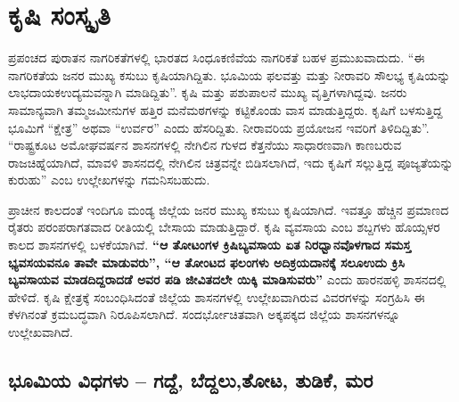 
\chapter{ಕೃಷಿ ಸಂಸ್ಕೃತಿ}

\vskip 4pt

ಪ್ರಪಂಚದ ಪುರಾತನ ನಾಗರಿಕತೆಗಳಲ್ಲಿ ಭಾರತದ ಸಿಂಧೂಕಣಿವೆಯ ನಾಗರಿಕತೆ ಬಹಳ ಪ್ರಮುಖವಾದುದು. “ಈ ನಾಗರಿಕತೆಯ ಜನರ ಮುಖ್ಯ ಕಸುಬು ಕೃಷಿಯಾಗಿದ್ದಿತು. ಭೂಮಿಯ ಫಲವತ್ತು ಮತ್ತು ನೀರಾವರಿ ಸೌಲಭ್ಯ ಕೃಷಿಯನ್ನು ಲಾಭದಾಯಕ\break ಉದ್ಯಮವನ್ನಾಗಿ ಮಾಡಿದ್ದಿತು”. ಕೃಷಿ ಮತ್ತು ಪಶುಪಾಲನೆ ಮುಖ್ಯ ವೃತ್ತಿಗಳಾಗಿದ್ದವು. ಜನರು ಸಾಮಾನ್ಯವಾಗಿ ತಮ್ಮ\break ಜಮೀನುಗಳ ಹತ್ತಿರ ಮನೆಮಠಗಳನ್ನು ಕಟ್ಟಿಕೊಂಡು ವಾಸ ಮಾಡುತ್ತಿದ್ದರು. ಕೃಷಿಗೆ ಬಳಸುತ್ತಿದ್ದ ಭೂಮಿಗೆ “ಕ್ಷೇತ್ರ” ಅಥವಾ “ಉರ್ವರ” ಎಂದು ಹೆಸರಿದ್ದಿತು. ನೀರಾವರಿಯ ಪ್ರಯೋಜನ ಇವರಿಗೆ ತಿಳಿದಿದ್ದಿತು”. “ರಾಷ್ಟ್ರಕೂಟ ಅಮೋಘವರ್ಷನ ಶಾಸನಗಳಲ್ಲಿ ನೇಗಿಲಿನ ಗುಳದ ಕೆತ್ತನೆಯು ಸಾಧಾರಣವಾಗಿ ಕಾಣಬರುವ ರಾಜಚಿಹ್ನೆಯಾಗಿದೆ, ಮಾವಳಿ ಶಾಸನದಲ್ಲಿ ನೇಗಿಲಿನ ಚಿತ್ರವನ್ನೇ ಬಿಡಿಸಲಾಗಿದೆ, ಇದು ಕೃಷಿಗೆ ಸಲ್ಲುತ್ತಿದ್ದ ಪೂಜ್ಯತೆಯನ್ನು ಕುರುಹು” ಎಂಬ ಉಲ್ಲೇಖಗಳನ್ನು ಗಮನಿಸಬಹುದು.

ಪ್ರಾಚೀನ ಕಾಲದಂತೆ ಇಂದಿಗೂ ಮಂಡ್ಯ ಜಿಲ್ಲೆಯ ಜನರ ಮುಖ್ಯ ಕಸುಬು ಕೃಷಿಯಾಗಿದೆ. ಇವತ್ತೂ ಹೆಚ್ಚಿನ ಪ್ರಮಾಣದ ರೈತರು ಪರಂಪರಾಗತವಾದ ರೀತಿಯಲ್ಲಿ ಬೇಸಾಯ ಮಾಡುತ್ತಿದ್ದಾರೆ. ಕೃಷಿ ವ್ಯವಸಾಯ ಎಂಬ ಶಬ್ದಗಳು ಹೊಯ್ಸಳರ ಕಾಲದ ಶಾಸನಗಳಲ್ಲಿ ಬಳಕೆಯಾಗಿವೆ. \textbf{“ಆ ತೋಟಂಗಳ ಕ್ರಿಷಿಬ್ಯವಸಾಯ ಏತ ನಿರಧ್ವಾನವೊಳಗಾದ ಸಮಸ್ತ ಭ್ಯವಸಯವನೂ ತಾವೇ\general{\break } ಮಾಡುವರು”, “ಆ ತೋಂಟದ ಫಲಂಗಳು ಅದಿಕ್ರಯದಾನಕ್ಕೆ ಸಲೂಉದು ಕ್ರಿಸಿ ಬ್ಯವಸಾಯವ ಮಾಡದಿದ್ದರಾದಡೆ ಅವರ ಪಡಿ ಜೀವಿತದಲೇ ಯಿಕ್ಕಿ ಮಾಡಿಸುವರು”} ಎಂದು ಹಾರನಹಳ್ಳಿ ಶಾಸನದಲ್ಲಿ ಹೇಳಿದೆ. ಕೃಷಿ ಕ್ಷೇತ್ರಕ್ಕೆ ಸಂಬಂಧಿಸಿದಂತೆ ಜಿಲ್ಲೆಯ ಶಾಸನಗಳಲ್ಲಿ ಉಲ್ಲೇಖವಾಗಿರುವ ವಿವರಗಳನ್ನು ಸಂಗ್ರಹಿಸಿ ಈ ಕೆಳಗಿನಂತೆ ಕ್ರಮಬದ್ಧವಾಗಿ ನಿರೂಪಿಸಲಾಗಿದೆ. ಸಂದರ್ಭೋಚಿತವಾಗಿ ಅಕ್ಕಪಕ್ಕದ ಜಿಲ್ಲೆಯ ಶಾಸನಗಳನ್ನೂ ಉಲ್ಲೇಖವಾಗಿದೆ.

\section{ಭೂಮಿಯ ವಿಧಗಳು – ಗದ್ದೆ, ಬೆದ್ದಲು,ತೋಟ, ತುಡಿಕೆ, ಮರ}

